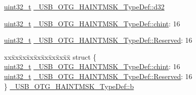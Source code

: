\begin{DoxyCompactItemize}
\begin{tabbing}
\end{tabbing}\item 
\hyperlink{stdint_8h_a435d1572bf3f880d55459d9805097f62}{uint32\-\_\-t} \hyperlink{group___u_s_b___o_t_g___d_r_i_v_e_r_ga8c38bda0e50eba179a611f7e1f6458d9}{\-\_\-\-U\-S\-B\-\_\-\-O\-T\-G\-\_\-\-H\-A\-I\-N\-T\-M\-S\-K\-\_\-\-Type\-Def\-::d32}
\item 
\hyperlink{stdint_8h_a435d1572bf3f880d55459d9805097f62}{uint32\-\_\-t} \hyperlink{group___u_s_b___o_t_g___d_r_i_v_e_r_ga156b3c134342527fb279cc80d1a79276}{\-\_\-\-U\-S\-B\-\_\-\-O\-T\-G\-\_\-\-H\-A\-I\-N\-T\-M\-S\-K\-\_\-\-Type\-Def\-::chint}\-: 16
\item 
\hyperlink{stdint_8h_a435d1572bf3f880d55459d9805097f62}{uint32\-\_\-t} \hyperlink{group___u_s_b___o_t_g___d_r_i_v_e_r_ga0b3bf390ca5997788021a23ac28ec682}{\-\_\-\-U\-S\-B\-\_\-\-O\-T\-G\-\_\-\-H\-A\-I\-N\-T\-M\-S\-K\-\_\-\-Type\-Def\-::\-Reserved}\-: 16
\item 
\begin{tabbing}
xx\=xx\=xx\=xx\=xx\=xx\=xx\=xx\=xx\=\kill
struct \{\\
\>\hyperlink{stdint_8h_a435d1572bf3f880d55459d9805097f62}{uint32\_t} \hyperlink{group___u_s_b___o_t_g___d_r_i_v_e_r_ga156b3c134342527fb279cc80d1a79276}{\_USB\_OTG\_HAINTMSK\_TypeDef::chint}: 16\\
\>\hyperlink{stdint_8h_a435d1572bf3f880d55459d9805097f62}{uint32\_t} \hyperlink{group___u_s_b___o_t_g___d_r_i_v_e_r_ga0b3bf390ca5997788021a23ac28ec682}{\_USB\_OTG\_HAINTMSK\_TypeDef::Reserved}: 16\\
\} \hyperlink{group___u_s_b___o_t_g___d_r_i_v_e_r_ga25171c349b89691388dcc922cdfaa435}{\_USB\_OTG\_HAINTMSK\_TypeDef::b}\\


\end{tabbing}
\end{DoxyCompactItemize}
